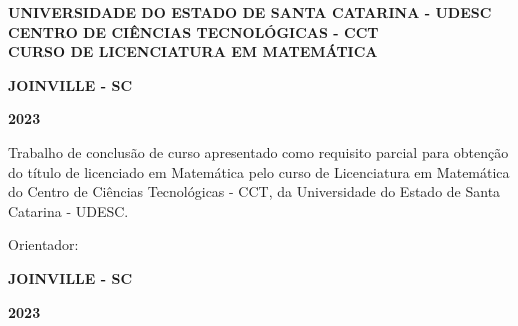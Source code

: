 \documentclass[../main.tex]{subfiles}
\begin{document}

\pretextual

\begin{center}
\thispagestyle{empty}%
 \textbf{ UNIVERSIDADE DO ESTADO DE SANTA CATARINA - UDESC\\
CENTRO DE CIÊNCIAS TECNOLÓGICAS - CCT\\
CURSO DE LICENCIATURA EM MATEMÁTICA\\}
\vspace{4 cm}\textbf{\authorName}

\vspace{4 cm}\titleComplete

\textbf{JOINVILLE - SC}

\textbf{2023}
 \pagebreak
\end{center}



\begin{folhaderosto}

  \begin{center}
    \textbf{\authorName}

    \vspace*{\fill}\vspace*{\fill}
    \titleComplete
    \vspace*{\fill}
  \end{center}
  
  \begin{flushright}
  \begin{minipage}[t]{8 cm}
  { Trabalho de conclusão de curso apresentado como requisito parcial para obtenção do título de licenciado em Matemática pelo curso de Licenciatura em Matemática do Centro de Ciências Tecnológicas - CCT, da Universidade do Estado de Santa Catarina - UDESC. 

 Orientador: \orientationBy}
  \end{minipage}
  \end{flushright}
  
  
  \begin{center}
   \textbf{JOINVILLE - SC}
 
   \textbf{2023} 
  \end{center}
\end{folhaderosto}
\end{document}
